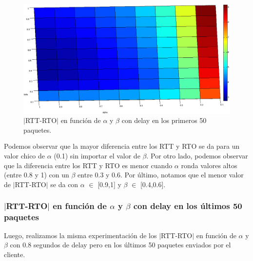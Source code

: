 \documentclass[10pt, a4paper]{article}
\begin{document}
\begin{figure}[H]
\begin{center}
\includegraphics[width=17cm]{delay-50F.png}
\caption{$|$RTT-RTO$|$ en función de $\alpha$ y $\beta$ con delay en los primeros 50 paquetes.}
\end{center}
\end{figure}

Podemos observar que la mayor diferencia entre los RTT y RTO se da para un valor chico de $\alpha$ (0.1) sin importar el valor de $\beta$.
Por otro lado, podemos observar que la diferencia entre los RTT y RTO es menor cuando $\alpha$ ronda valores altos (entre 0.8 y 1) con un $\beta$ entre 0.3 y 0.6.
Por último, notamos que el menor valor de $|$RTT-RTO$|$ se da con $\alpha$ $\in$ [0.9,1] y $\beta$ $\in$ [0.4,0.6].

\subsubsection{$|$RTT-RTO$|$ en función de $\alpha$ y $\beta$ con delay en los últimos 50 paquetes}
Luego, realizamos la misma experimentación de los $|$RTT-RTO$|$ en función de $\alpha$ y $\beta$ con 0.8 segundos de delay pero en los últimos 50 paquetes enviados por el cliente.

\end{document}
